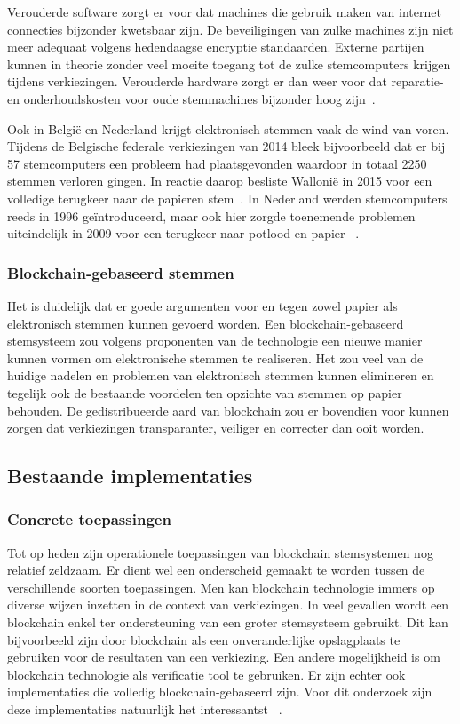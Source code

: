 			Verouderde software zorgt er voor dat machines die gebruik maken van internet connecties bijzonder kwetsbaar zijn. De beveiligingen van zulke machines zijn niet meer adequaat volgens hedendaagse encryptie standaarden. Externe partijen kunnen in theorie zonder veel moeite toegang tot de zulke stemcomputers krijgen tijdens verkiezingen. Verouderde hardware zorgt er dan weer voor dat reparatie- en onderhoudskosten voor oude stemmachines bijzonder hoog zijn~\autocite{Norden2015}.
			
			Ook in België en Nederland krijgt elektronisch stemmen vaak de wind van voren. Tijdens de Belgische federale verkiezingen van 2014 bleek bijvoorbeeld dat er bij 57 stemcomputers een probleem had plaatsgevonden waardoor in totaal 2250 stemmen verloren gingen. In reactie daarop besliste Wallonië in 2015 voor een volledige terugkeer naar de papieren stem~\autocite{Maddens2018}.  In Nederland werden stemcomputers reeds in 1996 geïntroduceerd, maar ook hier zorgde toenemende problemen uiteindelijk in 2009 voor een terugkeer naar potlood en papier ~\autocite{Schellevis2018}.
			
			\subsubsection{Blockchain-gebaseerd stemmen}
			Het is duidelijk dat er goede argumenten voor en tegen zowel papier als elektronisch stemmen kunnen gevoerd worden. Een blockchain-gebaseerd stemsysteem zou volgens proponenten van de technologie een nieuwe manier kunnen vormen om elektronische stemmen te realiseren. Het zou veel van de huidige nadelen en problemen van elektronisch stemmen kunnen elimineren  en tegelijk ook de bestaande voordelen ten opzichte van stemmen op papier behouden. De gedistribueerde aard van blockchain zou er bovendien voor kunnen zorgen dat verkiezingen transparanter, veiliger en correcter dan ooit worden. 
			 
	\subsection{Bestaande implementaties}
			\subsubsection{Concrete toepassingen}
			Tot op heden zijn operationele toepassingen van blockchain stemsystemen nog relatief zeldzaam.  Er dient wel  een onderscheid gemaakt te worden tussen de verschillende soorten toepassingen. Men kan  blockchain technologie immers op diverse wijzen inzetten in de context van verkiezingen. In veel gevallen wordt een blockchain enkel ter ondersteuning van een groter stemsysteem gebruikt. Dit kan bijvoorbeeld zijn door blockchain als  een onveranderlijke opslagplaats te gebruiken voor de resultaten van een verkiezing. Een andere mogelijkheid is om blockchain technologie als verificatie tool te gebruiken. Er zijn echter ook implementaties die volledig blockchain-gebaseerd zijn. Voor dit onderzoek zijn deze implementaties natuurlijk het interessantst ~\autocite{Kshetri2018}.
			
